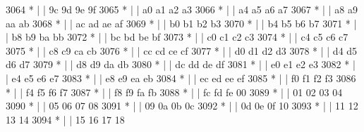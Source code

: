 \begin{DoxyCode}
3064 \textcolor{comment}{         * |    |                           9c  9d  9e  9f}
3065 \textcolor{comment}{         * |    |                           a0  a1  a2  a3}
3066 \textcolor{comment}{         * |    |                           a4  a5  a6  a7}
3067 \textcolor{comment}{         * |    |                           a8  a9  aa  ab}
3068 \textcolor{comment}{         * |    |                           ac  ad  ae  af}
3069 \textcolor{comment}{         * |    |                           b0  b1  b2  b3}
3070 \textcolor{comment}{         * |    |                           b4  b5  b6  b7}
3071 \textcolor{comment}{         * |    |                           b8  b9  ba  bb}
3072 \textcolor{comment}{         * |    |                           bc  bd  be  bf}
3073 \textcolor{comment}{         * |    |                           c0  c1  c2  c3}
3074 \textcolor{comment}{         * |    |                           c4  c5  c6  c7}
3075 \textcolor{comment}{         * |    |                           c8  c9  ca  cb}
3076 \textcolor{comment}{         * |    |                           cc  cd  ce  cf}
3077 \textcolor{comment}{         * |    |                           d0  d1  d2  d3}
3078 \textcolor{comment}{         * |    |                           d4  d5  d6  d7}
3079 \textcolor{comment}{         * |    |                           d8  d9  da  db}
3080 \textcolor{comment}{         * |    |                           dc  dd  de  df}
3081 \textcolor{comment}{         * |    |                           e0  e1  e2  e3}
3082 \textcolor{comment}{         * |    |                           e4  e5  e6  e7}
3083 \textcolor{comment}{         * |    |                           e8  e9  ea  eb}
3084 \textcolor{comment}{         * |    |                           ec  ed  ee  ef}
3085 \textcolor{comment}{         * |    |                           f0  f1  f2  f3}
3086 \textcolor{comment}{         * |    |                           f4  f5  f6  f7}
3087 \textcolor{comment}{         * |    |                           f8  f9  fa  fb}
3088 \textcolor{comment}{         * |    |                           fc  fd  fe  00}
3089 \textcolor{comment}{         * |    |                           01  02  03  04}
3090 \textcolor{comment}{         * |    |                           05  06  07  08}
3091 \textcolor{comment}{         * |    |                           09  0a  0b  0c}
3092 \textcolor{comment}{         * |    |                           0d  0e  0f  10}
3093 \textcolor{comment}{         * |    |                           11  12  13  14}
3094 \textcolor{comment}{         * |    |                           15  16  17  18}

\end{DoxyCode}
